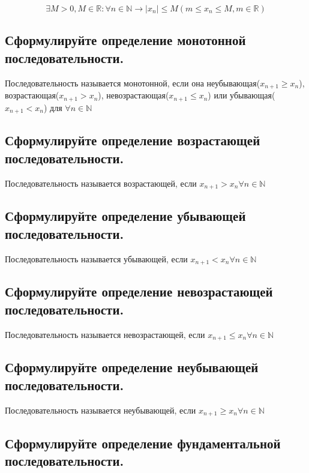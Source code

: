    $$\exists M > 0, M \in \mathbb{R}: \forall n \in \mathbb{N} \longrightarrow |x_n|  \leqslant  M 
    (m  \leqslant  x_n  \leqslant  M, m \in \mathbb{R})$$

    \subsection{Сформулируйте определение монотонной последовательности.}
    
    Последовательность называется монотонной, если она неубывающая($x_{n+1} \geqslant x_n$), возрастающая($x_{n+1}>x_n$), 
    невозрастающая($x_{n+1} \leqslant x_n$) или убывающая($x_{n+1}<x_n$) для $\forall n \in \mathbb{N}$

    \subsection{Сформулируйте определение возрастающей последовательности.}

    Последовательность называется возрастающей, если $x_{n+1} > x_n \forall n \in \mathbb{N}$
        
    \subsection{Сформулируйте определение убывающей последовательности.}

    Последовательность называется убывающей, если $x_{n+1} < x_n \forall n \in \mathbb{N}$
        
    \subsection{Сформулируйте определение невозрастающей последовательности.}
    
    Последовательность называется невозрастающей, если $x_{n+1} \leqslant x_n \forall n \in \mathbb{N}$
        
    \subsection{Сформулируйте определение неубывающей последовательности.}
    
    Последовательность называется неубывающей, если $x_{n+1} \geqslant x_n \forall n \in \mathbb{N}$
    
    \subsection{Сформулируйте определение фундаментальной последовательности.}
    

